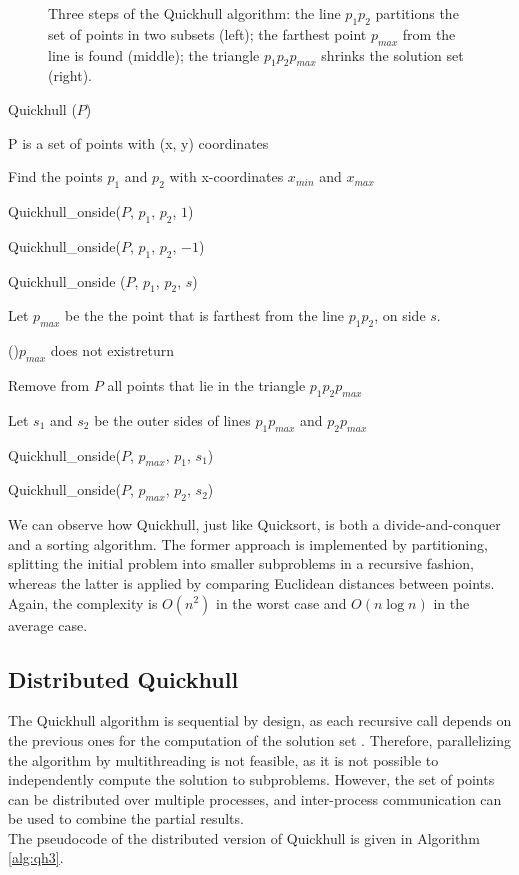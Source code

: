 \documentclass[]{finalproject}
\begin{document}
\begin{figure}[H]
\begin{minipage}{.33\linewidth}
	\end{minipage}
    \caption{Three steps of the Quickhull algorithm: the line $p_1p_2$ partitions the set of points in two subsets (left); the farthest point $p_{max}$ from the line is found (middle); the triangle $p_1p_2p_{max}$ shrinks the solution set (right).}
    \label{fig:qh-steps}
\end{figure}

\begin{algorithm}
    \caption{Quickhull ($P$)}
    \label{alg:qh1}
    P is a set of points with (x, y) coordinates

    Find the points $p_1$ and $p_2$ with x-coordinates $x_{min}$ and $x_{max}$

    Quickhull\_onside($P$, $p_1$, $p_2$, $1$)

    Quickhull\_onside($P$, $p_1$, $p_2$, $-1$)
\end{algorithm}
\begin{algorithm}
  \caption{Quickhull\_onside ($P$, $p_1$, $p_2$, $s$)}
  \label{alg:qh2}
  Let $p_{max}$ be the the point that is farthest from the line $p_1p_2$, on side $s$.

  \If(){$p_{max}$ does not exist}{return}

  Remove from $P$ all points that lie in the triangle $p_1p_2p_{max}$

  Let $s_1$ and $s_2$ be the outer sides of lines $p_1p_{max}$ and $p_2p_{max}$

  Quickhull\_onside($P$, $p_{max}$, $p_1$, $s_1$)

  Quickhull\_onside($P$, $p_{max}$, $p_2$, $s_2$)
\end{algorithm}

We can observe how Quickhull, just like Quicksort,
is both a divide-and-conquer and a sorting algorithm. The former approach is implemented by partitioning,
splitting the initial problem into smaller subproblems in a recursive fashion, whereas the latter is applied by comparing
Euclidean distances between points. Again, the complexity is $O(n^2)$ in the worst case and $O(n\log{n})$ in the average case.

\subsection{Distributed Quickhull}
The Quickhull algorithm is sequential by design,
as each recursive call depends on the previous ones for the computation of the solution set \cite{qhpaper}.
Therefore, parallelizing the algorithm by multithreading is not feasible, as it is not possible to independently compute the solution to subproblems.
However, the set of points can be distributed over multiple processes, and inter-process communication can be used to combine the partial results.\\
The pseudocode of the distributed version of Quickhull is given in Algorithm \ref{alg:qh3}.
\end{document}
